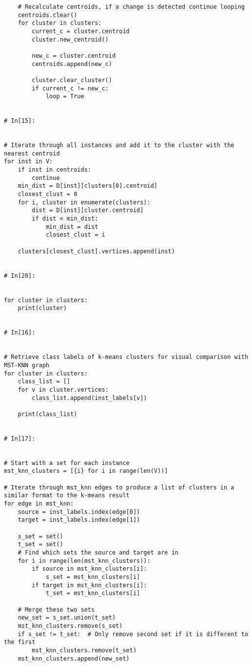 \documentclass[11pt, a4paper]{article}
\begin{document}
\begin{verbatim}
    # Recalculate centroids, if a change is detected continue looping
    centroids.clear()
    for cluster in clusters:
        current_c = cluster.centroid
        cluster.new_centroid()
        
        new_c = cluster.centroid
        centroids.append(new_c)
        
        cluster.clear_cluster()
        if current_c != new_c:
            loop = True


# In[15]:


# Iterate through all instances and add it to the cluster with the nearest centroid
for inst in V:
    if inst in centroids:
        continue
    min_dist = D[inst][clusters[0].centroid]
    closest_clust = 0
    for i, cluster in enumerate(clusters):        
        dist = D[inst][cluster.centroid]
        if dist < min_dist:
            min_dist = dist
            closest_clust = i

    clusters[closest_clust].vertices.append(inst)


# In[20]:


for cluster in clusters:
    print(cluster)


# In[16]:


# Retrieve class labels of k-means clusters for visual comparison with MST-KNN graph
for cluster in clusters:
    class_list = []
    for v in cluster.vertices:
        class_list.append(inst_labels[v])
        
    print(class_list)


# In[17]:


# Start with a set for each instance
mst_knn_clusters = [{i} for i in range(len(V))]

# Iterate through mst_knn edges to produce a list of clusters in a similar format to the k-means result
for edge in mst_knn:
    source = inst_labels.index(edge[0])
    target = inst_labels.index(edge[1])
    
    s_set = set()
    t_set = set()
    # Find which sets the source and target are in
    for i in range(len(mst_knn_clusters)):
        if source in mst_knn_clusters[i]:
            s_set = mst_knn_clusters[i]
        if target in mst_knn_clusters[i]:
            t_set = mst_knn_clusters[i]
            
    # Merge these two sets
    new_set = s_set.union(t_set)
    mst_knn_clusters.remove(s_set)
    if s_set != t_set:  # Only remove second set if it is different to the first
        mst_knn_clusters.remove(t_set)
    mst_knn_clusters.append(new_set)
    

\end{verbatim}
\end{document}
